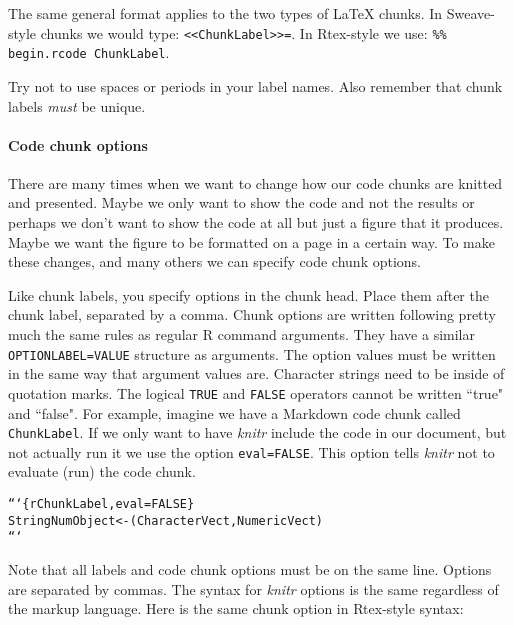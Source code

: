 \noindent The same general format applies to the two types of LaTeX chunks. In Sweave-style chunks we would type: \texttt{\textless\textless ChunkLabel\textgreater\textgreater=}. In Rtex-style we use: \texttt{\%\% begin.rcode ChunkLabel}.

Try not to use spaces or periods in your label names. Also remember that chunk labels {\emph{must}} be unique.

\paragraph{Code chunk options}

There are many times when we want to change how our code chunks are knitted and presented. Maybe we only want to show the code and not the results or perhaps we don't want to show the code at all but just a figure that it produces. Maybe we want the figure to be formatted on a page in a certain way. To make these changes, and many others we can specify code chunk options.

Like chunk labels, you specify options in the chunk head. Place them after the chunk label, separated by a comma. Chunk options are written following pretty much the same rules as regular R command arguments. They have a similar \texttt{OPTIONLABEL=VALUE} structure as arguments. The option values must be written in the same way that argument values are. Character strings need to be inside of quotation marks. The logical \texttt{TRUE} and \texttt{FALSE} operators cannot be written ``true" and ``false". For example, imagine we have a Markdown code chunk called \texttt{ChunkLabel}. If we only want to have {\emph{knitr}} include the code in our document, but not actually run it we use the option \texttt{eval=FALSE}. This option tells {\emph{knitr}} not to evaluate (run) the code chunk.

\begin{knitrout}
\color{fgcolor}\begin{kframe}
\begin{alltt}
```\{r ChunkLabel, eval=FALSE\}
StringNumObject <- (CharacterVect, NumericVect)
```
\end{alltt}
\end{kframe}
\end{knitrout}


\noindent Note that all labels and code chunk options must be on the same line. Options are separated by commas. The syntax for {\emph{knitr}} options is the same regardless of the markup language. Here is the same chunk option in Rtex-style syntax:

